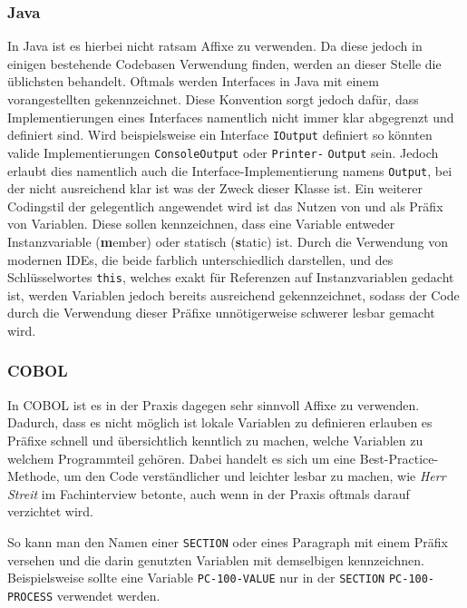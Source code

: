 \subsubsection*{Java}
In Java ist es hierbei nicht ratsam Affixe zu verwenden. Da diese jedoch in einigen bestehende Codebasen Verwendung finden, werden an dieser Stelle die üblichsten behandelt.
Oftmals werden Interfaces in Java mit einem vorangestellten  gekennzeichnet. Diese Konvention sorgt jedoch dafür, dass Implementierungen eines Interfaces namentlich nicht immer klar abgegrenzt und definiert sind. Wird beispielsweise ein Interface \texttt{IOutput} definiert so könnten valide Implementierungen \texttt{ConsoleOutput} oder \texttt{Printer-} \texttt{Output} sein. Jedoch erlaubt dies namentlich auch die Interface-Implementierung namens \texttt{Output}, bei der nicht ausreichend klar ist was der Zweck dieser Klasse ist.
Ein weiterer Codingstil der gelegentlich angewendet wird ist das Nutzen von  und  als Präfix von Variablen. Diese sollen kennzeichnen, dass eine Variable entweder Instanzvariable (\textbf{m}ember) oder statisch (\textbf{s}tatic) ist. Durch die Verwendung von modernen IDEs, die beide farblich unterschiedlich darstellen, und des Schlüsselwortes \texttt{this}, welches exakt für Referenzen auf Instanzvariablen gedacht ist, werden Variablen jedoch bereits ausreichend gekennzeichnet, sodass der Code durch die Verwendung dieser Präfixe unnötigerweise schwerer lesbar gemacht wird.

\subsubsection*{COBOL}\label{affixCOBOL}
In COBOL ist es in der Praxis dagegen sehr sinnvoll Affixe zu verwenden. Dadurch, dass es nicht möglich ist lokale Variablen zu definieren erlauben es Präfixe schnell und übersichtlich kenntlich zu machen, welche Variablen zu welchem Programmteil gehören. Dabei handelt es sich um eine Best-Practice-Methode, um den Code verständlicher und leichter lesbar zu machen, wie \textit{Herr Streit} im Fachinterview betonte, auch wenn in der Praxis oftmals darauf verzichtet wird.

So kann man den Namen einer \texttt{SECTION} oder eines Paragraph mit einem Präfix versehen und die darin genutzten Variablen mit demselbigen kennzeichnen. Beispielsweise sollte eine Variable \texttt{PC-100-VALUE} nur in der \texttt{SECTION} \texttt{PC-100-PROCESS} verwendet werden. 

